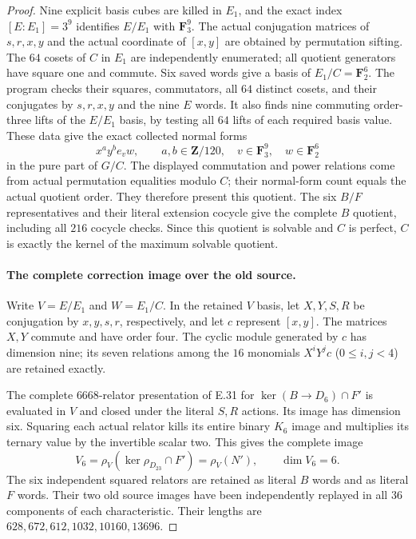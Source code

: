 \begin{proof}
Nine explicit basis cubes are killed in $E_1$, and the exact
index $[E:E_1]=3^9$ identifies $E/E_1$ with $\mathbf F_3^9$.
The actual conjugation matrices of $s,r,x,y$ and the actual
coordinate of $[x,y]$ are obtained by permutation sifting.
The $64$ cosets of $C$ in $E_1$ are independently enumerated;
all quotient generators have square one and commute.
Six saved words give a basis of $E_1/C=\mathbf F_2^6$.
The program checks their squares, commutators, all $64$ distinct
cosets, and their conjugates by $s,r,x,y$ and the nine $E$ words.
It also finds nine commuting order-three lifts of the $E/E_1$
basis, by testing all $64$ lifts of each required basis value.
These data give the exact collected normal forms
\[
       x^a y^b e_v w,
       \qquad a,b\in\mathbf Z/120,
       \quad v\in\mathbf F_3^9,
       \quad w\in\mathbf F_2^6
 \tag{E.48.9}
\]
in the pure part of $G/C$.
The displayed commutation and power relations come from actual
permutation equalities modulo $C$; their normal-form count equals
the actual quotient order.  They therefore present this quotient.
The six $B/F$ representatives and their literal extension cocycle
give the complete $B$ quotient, including all $216$ cocycle checks.
Since this quotient is solvable and $C$ is perfect, $C$ is exactly
the kernel of the maximum solvable quotient.

\paragraph{The complete correction image over the old source.}
Write $V=E/E_1$ and $W=E_1/C$.
In the retained $V$ basis, let $X,Y,S,R$ be conjugation by
$x,y,s,r$, respectively, and let $c$ represent $[x,y]$.
The matrices $X,Y$ commute and have order four.
The cyclic module generated by $c$ has dimension nine;
its seven relations among the $16$ monomials
$X^iY^j c$ ($0\leq i,j<4$) are retained exactly.

The complete $6668$-relator presentation of E.31 for
$\ker(B\to D_6)\cap F'$ is evaluated in $V$ and closed
under the literal $S,R$ actions.
Its image has dimension six.
Squaring each actual relator kills its entire binary $K_6$
image and multiplies its ternary value by the invertible
scalar two.  This gives the complete image
\[
 V_6=\rho_V(\ker\rho_{D_{23}}\cap F')
       =\rho_V(N'),\qquad \dim V_6=6.
 \tag{E.48.10}
\]
The six independent squared relators are retained as literal
$B$ words and as literal $F$ words.
Their two old source images have been independently replayed
in all $36$ components of each characteristic.
Their lengths are $628,672,612,1032,10160,13696$.


\end{proof}
